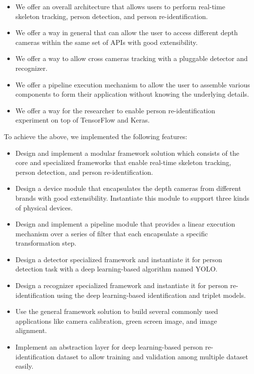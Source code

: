 \begin{itemize}
    \item We offer an overall architecture that allows users to perform
    real-time skeleton tracking, person detection, and person
    re-identification.
    
    \item We offer a way in general that can allow the user to access
    different depth cameras within the same set of APIs with good extensibility.
    
    \item We offer a way to allow cross cameras tracking with a pluggable
    detector and recognizer.
    
    \item We offer a pipeline execution mechanism to allow the user to assemble 
    various components to form their application without knowing the underlying 
    details.
    
    \item We offer a way for the researcher to enable person re-identification
    experiment on top of TensorFlow and Keras.
\end{itemize}

\noindent To achieve the above, we implemented the following features:

\begin{itemize}
	\item Design and implement a modular framework solution which consists of
	the core and specialized frameworks that enable real-time skeleton 
	tracking, person detection, and person re-identification.

    \item Design a device module that encapsulates the depth cameras from
    different brands with good extensibility. Instantiate this module to
    support three kinds of physical devices.
    
    \item Design and implement a pipeline module that provides a linear
    execution mechanism over a series of filter that each encapsulate a 
    specific transformation step.

    \item Design a detector specialized framework and instantiate it for
    person detection task with a deep learning-based algorithm named YOLO.

    \item Design a recognizer specialized framework and instantiate it for
    person re-identification using the deep learning-based identification and
    triplet models.

    \item Use the general framework solution to build several commonly used
    applications like camera calibration, green screen image, and image
    alignment.

    \item Implement an abstraction layer for deep learning-based person
    re-identification dataset to allow training and validation among multiple
    dataset easily.
\end{itemize}

